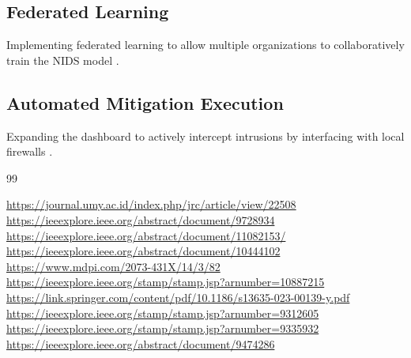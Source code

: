 \documentclass[12pt, a4paper]{report}
\begin{document}
\subsection{Federated Learning}
Implementing federated learning to allow multiple organizations to collaboratively train the NIDS model \cite{ref9}.
\subsection{Automated Mitigation Execution}
Expanding the dashboard to actively intercept intrusions by interfacing with local firewalls \cite{ref10}.

\renewcommand{\bibname}{References}
\begin{thebibliography}{99}

 \url{https://journal.umy.ac.id/index.php/jrc/article/view/22508}
 \url{https://ieeexplore.ieee.org/abstract/document/9728934}
 \url{https://ieeexplore.ieee.org/abstract/document/11082153/}
 \url{https://ieeexplore.ieee.org/abstract/document/10444102}
 \url{https://www.mdpi.com/2073-431X/14/3/82}
 \url{https://ieeexplore.ieee.org/stamp/stamp.jsp?arnumber=10887215}
 \url{https://link.springer.com/content/pdf/10.1186/s13635-023-00139-y.pdf}
 \url{https://ieeexplore.ieee.org/stamp/stamp.jsp?arnumber=9312605}
 \url{https://ieeexplore.ieee.org/stamp/stamp.jsp?arnumber=9335932}
 \url{https://ieeexplore.ieee.org/abstract/document/9474286}

\end{thebibliography}
\end{document}
